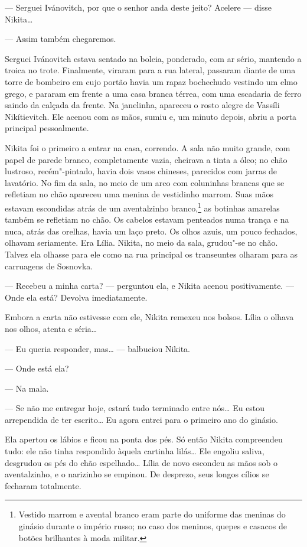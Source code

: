 --- Serguei Ivánovitch, por que o senhor anda deste jeito? Acelere ---
disse Nikita\ldots{}

--- Assim também chegaremos.

Serguei Ivánovitch estava sentado na boleia, ponderado, com ar sério,
mantendo a troica no trote. Finalmente, viraram para a rua lateral,
passaram diante de uma torre de bombeiro em cujo portão havia um rapaz
bochechudo vestindo um elmo grego, e pararam em frente a uma casa branca
térrea, com uma escadaria de ferro saindo da calçada da frente. Na
janelinha, apareceu o rosto alegre de Vassíli Nikítievitch. Ele acenou
com as mãos, sumiu e, um minuto depois, abriu a porta principal
pessoalmente.

Nikita foi o primeiro a entrar na casa, correndo. A sala não muito
grande, com papel de parede branco, completamente vazia, cheirava a
tinta a óleo; no chão lustroso, recém"-pintado, havia dois vasos
chineses, parecidos com jarras de lavatório. No fim da sala, no meio de
um arco com coluninhas brancas que se refletiam no chão apareceu uma
menina de vestidinho marrom. Suas mãos estavam escondidas atrás de um
aventalzinho branco,\footnote{Vestido marrom e avental branco eram parte
  do uniforme das meninas do ginásio durante o império russo; no caso
  dos meninos, quepes e casacos de botões brilhantes à moda militar.} as
botinhas amarelas também se refletiam no chão. Os cabelos estavam
penteados numa trança e na nuca, atrás das orelhas, havia um laço preto.
Os olhos azuis, um pouco fechados, olhavam seriamente. Era Lília.
Nikita, no meio da sala, grudou"-se no chão. Talvez ela olhasse para
ele como na rua principal os transeuntes olharam para as carruagens de
Sosnovka.

--- Recebeu a minha carta? --- perguntou ela, e Nikita acenou
positivamente. --- Onde ela está? Devolva imediatamente.

Embora a carta não estivesse com ele, Nikita remexeu nos bolsos. Lília
o olhava nos olhos, atenta e séria\ldots{}

--- Eu queria responder, mas\ldots{} --- balbuciou Nikita.

--- Onde está ela?

--- Na mala.

--- Se não me entregar hoje, estará tudo terminado entre nós\ldots{} Eu estou
arrependida de ter escrito\ldots{} Eu agora entrei para o primeiro ano do
ginásio.

Ela apertou os lábios e ficou na ponta dos pés. Só então Nikita
compreendeu tudo: ele não tinha respondido àquela cartinha lilás\ldots{} Ele
engoliu saliva, desgrudou os pés do chão espelhado\ldots{} Lília de novo
escondeu as mãos sob o aventalzinho, e o narizinho se empinou. De
desprezo, seus longos cílios se fecharam totalmente.

